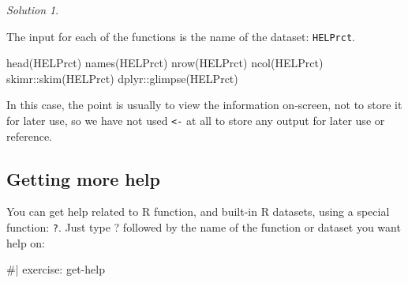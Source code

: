 \documentclass[
  letterpaper,
  DIV=11,
  numbers=noendperiod]{scrreprt}
\newenvironment{Shaded}{\begin{snugshade}}{\end{snugshade}}
\newcommand{\FunctionTok}[1]{\textcolor[rgb]{0.28,0.35,0.67}{#1}}
\newcommand{\NormalTok}[1]{\textcolor[rgb]{0.00,0.23,0.31}{#1}}
\newcommand{\SpecialCharTok}[1]{\textcolor[rgb]{0.37,0.37,0.37}{#1}}
\theoremstyle{remark}
\newtheorem*{solution}{Solution}
\begin{document}
\begin{solution}
\leavevmode

\begin{tcolorbox}[enhanced jigsaw, colbacktitle=quarto-callout-note-color!10!white, opacitybacktitle=0.6, titlerule=0mm, left=2mm, leftrule=.75mm, toptitle=1mm, toprule=.15mm, rightrule=.15mm, title=\textcolor{quarto-callout-note-color}{\faInfo}\hspace{0.5em}{Solution}, colback=white, arc=.35mm, colframe=quarto-callout-note-color-frame, bottomrule=.15mm, breakable, bottomtitle=1mm, opacityback=0, coltitle=black]

The input for each of the functions is the name of the dataset:
\texttt{HELPrct}.

\begin{Shaded}
\begin{Highlighting}[]
\FunctionTok{head}\NormalTok{(HELPrct)}
\FunctionTok{names}\NormalTok{(HELPrct)}
\FunctionTok{nrow}\NormalTok{(HELPrct)}
\FunctionTok{ncol}\NormalTok{(HELPrct)}
\NormalTok{skimr}\SpecialCharTok{::}\FunctionTok{skim}\NormalTok{(HELPrct)}
\NormalTok{dplyr}\SpecialCharTok{::}\FunctionTok{glimpse}\NormalTok{(HELPrct)}
\end{Highlighting}
\end{Shaded}

In this case, the point is usually to view the information on-screen,
not to store it for later use, so we have not used \texttt{\textless{}-}
at all to store any output for later use or reference.

\end{tcolorbox}

\end{solution}

\subsection{Getting more help}\label{getting-more-help}

You can get help related to R function, and built-in R datasets, using a
special function: \texttt{?}. Just type ? followed by the name of the
function or dataset you want help on:

\begin{Shaded}
\begin{Highlighting}[]
\NormalTok{\#| exercise: get{-}help}
\end{Highlighting}
\end{Shaded}
\end{document}
